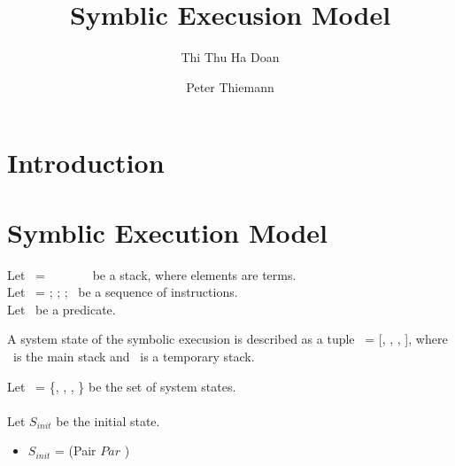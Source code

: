 \documentclass[runningheads]{llncs}
\begin{document}
%
\title{Symblic Execusion Model}
%
%
\author{Thi Thu Ha Doan\and
  Peter Thiemann}

%
%
%
\maketitle              %
%
\begin{abstract}
 

\keywords{}
\end{abstract}

%
%
%
\section{Introduction}
\label{sec:introduction}

\section{Symblic Execution Model}
\label{sec:symblic-execution-model}

Let \STACK\ = \TermOne\ \STACKCONCAT\ \TermTwo\ \STACKCONCAT\ \DOT\ \STACKCONCAT\ \EMPTYSTACK\ be a stack, where elements are terms.
\\
Let \INSTRUCTION\ = \InstructionOne; \InstructionTwo; \DOT; \InstructionN\ be a sequence of instructions. 
\\
Let \PREDICATE\ be a predicate. 

\begin{definition}
A system state of the symbolic execusion is described as a tuple \STATE\ = [\INSTRUCTION, \STACK, \TSTACK, \PREDICATE], where \STACK\ is the main stack and \TSTACK\ is a temporary stack.
\end{definition}

Let \SYSTEM\ = \{\STATEONE, \STATETWO, \DOT, \STATEN \} be the set of system states.
\\
\\
Let $S_{init}$  be the initial state. 

\begin{itemize}
\item[]  $S_{init}$ = (Pair $Par$ \Term) \STACKCONCAT\ \EMPTYSTACK
\end{itemize}
\end{document}
